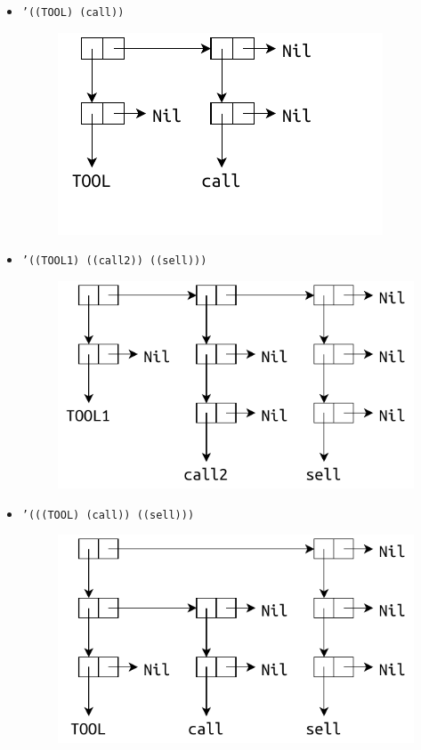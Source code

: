 \begin{itemize}
	\clearpage
	
	\item \texttt{'((TOOL) (call))}
	
	\begin{figure}[ht]
		\centering
		\includegraphics[scale=1.2]{img/1-4}
	\end{figure}
	
	\item \texttt{'((TOOL1) ((call2)) ((sell)))}
	
	\begin{figure}[ht]
		\centering
		\includegraphics[scale=1]{img/1-5}
	\end{figure}
	
	\item \texttt{'(((TOOL) (call)) ((sell)))}
	
	\begin{figure}[ht]
		\centering
		\includegraphics[scale=1]{img/1-6}
	\end{figure}
\end{itemize}

